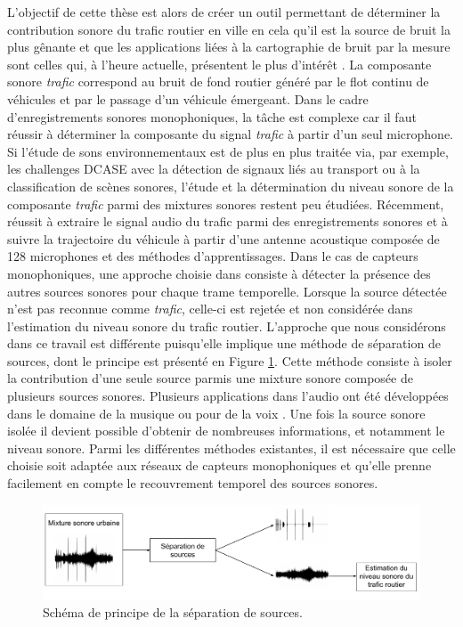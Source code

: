 L'objectif de cette thèse est alors de créer un outil permettant de déterminer la contribution sonore du trafic routier en ville en cela qu'il est la source de bruit la plus gênante et que les applications liées à la cartographie de bruit par la mesure sont celles qui, à l'heure actuelle, présentent le plus d'intérêt \cite{jagniatinskis2014assessment}. La composante sonore  \textit{trafic} correspond au bruit de fond routier généré par le flot continu de véhicules et par le passage d'un véhicule émergeant.
Dans le cadre d'enregistrements sonores monophoniques, la tâche est complexe car il faut réussir à déterminer la composante du signal \textit{trafic} à partir d'un seul microphone. Si l'étude de sons environnementaux est de plus en plus traitée via, par exemple, les challenges DCASE \cite{stowell2015detection,mesaros2017dcase} avec la détection de signaux liés au transport ou à la classification de scènes sonores, l'étude et la détermination du niveau sonore de la composante \textit{trafic} parmi des mixtures sonores restent peu étudiées. Récemment, \cite{leiba2017large} réussit à extraire le signal audio du trafic parmi des enregistrements sonores et à suivre la trajectoire du véhicule à partir d'une antenne acoustique composée de 128 microphones et des méthodes d'apprentissages.
Dans le cas de capteurs monophoniques, une approche choisie dans \cite{socoro2017anomalous} consiste à détecter la présence des autres sources sonores pour chaque trame temporelle. Lorsque la source détectée n'est pas reconnue comme \textit{trafic}, celle-ci est rejetée et non considérée dans l'estimation du niveau sonore du trafic routier. 
L'approche que nous considérons dans ce travail est différente puisqu'elle implique une méthode de séparation de sources, dont le principe est présenté en Figure \ref{fig:separation_source_intro}. Cette méthode consiste à isoler la contribution d'une seule source parmis une mixture sonore composée de plusieurs sources sonores. Plusieurs applications dans l'audio ont été développées dans le domaine de la musique \cite{smaragdis_non-negative_2003,virtanen_monaural_2007} ou pour de la voix \cite{weninger2012supervised,yilmaz2004blind}. Une fois la source sonore isolée il devient possible d'obtenir de nombreuses informations, et notamment le niveau sonore. Parmi les différentes méthodes existantes, il est nécessaire que celle choisie soit adaptée aux réseaux de capteurs monophoniques et qu'elle prenne facilement en compte le recouvrement temporel des sources sonores. 

\begin{figure}[h]
\centering
\includegraphics[width=\linewidth]{./figures/autres/schema_source_separation_FR.pdf}
\caption{Schéma de principe de la séparation de sources.}
\label{fig:separation_source_intro}
\end{figure}


